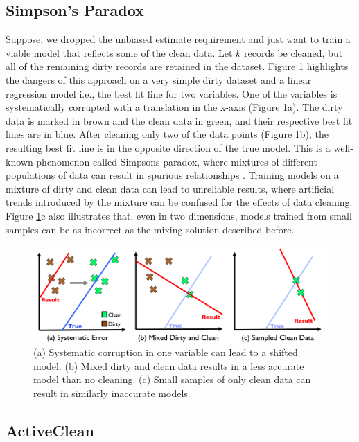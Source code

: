\subsection{Simpson's Paradox}



Suppose, we dropped the unbiased estimate requirement and just want to train a viable model that reflects some of the clean data.
Let $k$ records be cleaned, but all of the remaining dirty records are retained in the dataset.
Figure \ref{update-arch1} highlights the dangers of this approach on a very simple dirty dataset and a linear regression model i.e., the best fit line for two variables. 
One of the variables is systematically corrupted with a translation in the x-axis (Figure \ref{update-arch1}a).
The dirty data is marked in brown and the clean data in green, and their respective best fit lines are in blue.
After cleaning only two of the data points (Figure \ref{update-arch1}b), the resulting best fit line is in the opposite direction of the true model.
This is a well-known phenomenon called Simpsons paradox, where mixtures of different populations of data can result in spurious relationships \cite{simpson1951interpretation}.
Training models on a mixture of dirty and clean data can lead to unreliable results, where artificial trends introduced by the mixture can be confused for the effects of data cleaning.
Figure \ref{update-arch1}c also illustrates that, even in two dimensions, models trained from small samples can be as incorrect as the mixing solution described before.

\begin{figure}[ht!]
\centering
 \includegraphics[width=0.6\columnwidth]{figs/update-arch.png}
 \caption{(a) Systematic corruption in one variable can lead to a shifted model. 
 (b) Mixed dirty and clean data results in a less accurate model than no cleaning.
(c) Small samples of only clean data can result in similarly inaccurate models. \label{update-arch1}}
\end{figure}

\subsection{ActiveClean}

